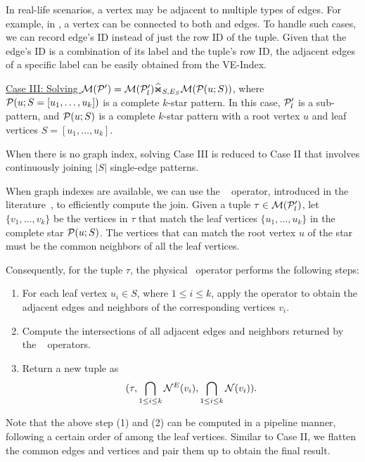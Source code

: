 In real-life scenarios, a vertex may be adjacent to multiple types of edges. For example, in , a  vertex can be connected to both  and  edges. To handle such cases, we can record edge's ID instead of just the row ID of the tuple. Given that the edge's ID is a combination of its label and the tuple's row ID, the adjacent edges of a specific label can be easily obtained from the VE-Index.

\underline{Case III: Solving $\mathcal{M}(\mathcal{P}') = \mathcal{M}(\mathcal{P}'_l) \widehat{\Join}_{S, E_S} \mathcal{M}(\mathcal{P}(u;S))$}, where $\mathcal{P}(u;S = [u_1, \ldots, u_k])$ is a complete $k$-star pattern. In this case, $\mathcal{P}'_l$ is a sub-pattern, and $\mathcal{P}(u;S)$ is a complete $k$-star pattern with a root vertex $u$ and leaf vertices $S = [u_1, \ldots, u_k]$.

When there is no graph index, solving Case III is reduced to Case II that involves continuously joining $|S|$ single-edge patterns.

When graph indexes are available, we can use the \expandintersect~ operator, introduced in the literature~\cite{huge,GLogS,mhedhbi2019optimizing}, to efficiently compute the join. Given a tuple $\tau \in \mathcal{M}(\mathcal{P}'_l)$, let $\{v_1, \ldots, v_k\}$ be the vertices in $\tau$ that match the leaf vertices $\{u_1, \ldots, u_k\}$ in the complete star $\mathcal{P}(u;S)$. The vertices that can match the root vertex $u$ of the star must be the common neighbors of all the leaf vertices.

Consequently, for the tuple $\tau$, the physical ~operator performs the following steps:

\begin{enumerate}
\item For each leaf vertex $u_i \in S$, where $1 \leq i \leq k$, apply the  operator to obtain the adjacent edges and neighbors of the corresponding vertices $v_i$.
\item Compute the intersections of all adjacent edges and neighbors returned by the \expand~ operators.
\item Return a new tuple as
\[
    (\tau, \bigcap_{1 \leq i \leq k}{\mathcal{N}}^E(v_i), \bigcap_{1 \leq i \leq k}{\mathcal{N}}(v_i)).
\]
\end{enumerate}

Note that the above step (1) and (2) can be computed in a pipeline manner, following a certain order of among the leaf vertices.
Similar to Case II, we flatten the common edges and vertices and pair them up to obtain the final result.

